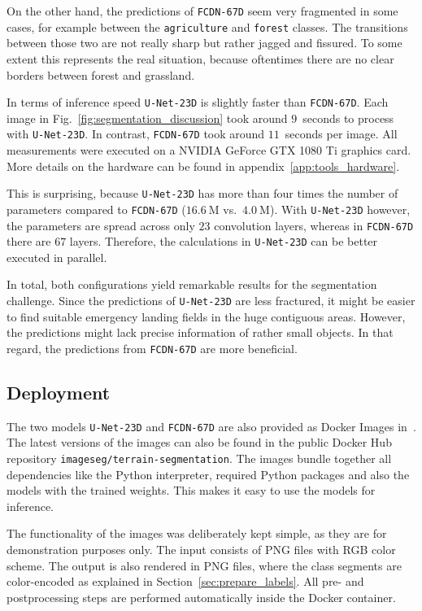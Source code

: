 On the other hand, the predictions of \texttt{FCDN-67D} seem very fragmented in some cases, for example between the \texttt{agriculture} and \texttt{forest} classes. The transitions between those two are not really sharp but rather jagged and fissured. To some extent this represents the real situation, because oftentimes there are no clear borders between forest and grassland.

In terms of inference speed \texttt{U-Net-23D} is slightly faster than \texttt{FCDN-67D}. Each image in Fig.~\ref{fig:segmentation_discussion} took around $9$~seconds to process with \texttt{U-Net-23D}. In contrast, \texttt{FCDN-67D} took around $11$~seconds per image. All measurements were executed on a NVIDIA GeForce GTX 1080 Ti graphics card. More details on the hardware can be found in appendix~\ref{app:tools_hardware}.

This is surprising, because \texttt{U-Net-23D} has more than four times the number of parameters compared to \texttt{FCDN-67D} ($16.6~\text{M}$ vs.\ $4.0~\text{M}$). With \texttt{U-Net-23D} however, the parameters are spread across only $23$ convolution layers, whereas in \texttt{FCDN-67D} there are $67$ layers. Therefore, the calculations in \texttt{U-Net-23D} can be better executed in parallel.

In total, both configurations yield remarkable results for the segmentation challenge. Since the predictions of \texttt{U-Net-23D} are less fractured, it might be easier to find suitable emergency landing fields in the huge contiguous areas. However, the predictions might lack precise information of rather small objects. In that regard, the predictions from \texttt{FCDN-67D} are more beneficial.

\subsection{Deployment}
The two models \texttt{U-Net-23D} and \texttt{FCDN-67D} are also provided as Docker Images in~\cite{thesis-code20}. The latest versions of the images can also be found in the public Docker Hub repository \texttt{imageseg/terrain-segmentation}. The images bundle together all dependencies like the Python interpreter, required Python packages and also the models with the trained weights. This makes it easy to use the models for inference.

The functionality of the images was deliberately kept simple, as they are for demonstration purposes only. The input consists of PNG files with RGB color scheme. The output is also rendered in PNG files, where the class segments are color-encoded as explained in Section~\ref{sec:prepare_labels}. All pre- and postprocessing steps are performed automatically inside the Docker container.

